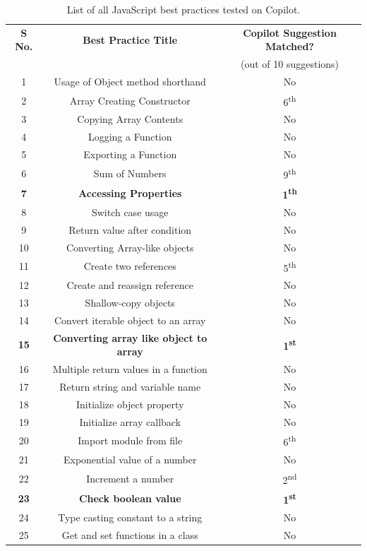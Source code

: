 \begin{table}[hbt!]
\begin{tabular}{|c|c|c|}
        \textbf{S No.} & \textbf{Best Practice  Title} & \textbf{Copilot Suggestion Matched?} \\
         & & (out of 10 suggestions) \\
         \hline
         1 & Usage of Object method shorthand & No \\
         \hline
         2 & Array Creating Constructor & 6\textsuperscript{th} \\
         \hline
         3 & Copying Array Contents  & No \\
         \hline
         4 & Logging a Function &  No \\
         \hline
         5 & Exporting a Function & No \\
         \hline
         6 & Sum of Numbers & 9\textsuperscript{th} \\
         \hline
         \textbf{7} & \textbf{Accessing Properties} & \textbf{1\textsuperscript{th}} \\
         \hline
         8 & Switch case usage & No \\
         \hline
         9 & Return value after condition & No \\
         \hline
         10 & Converting Array-like objects  & No \\
         \hline
         11 & Create two references & 5\textsuperscript{th} \\
         \hline
         12 & Create and reassign reference & No \\
         \hline
         13 & Shallow-copy objects  & No \\
         \hline
         14 & Convert iterable object to an array & No \\
         \hline
         \textbf{15} & \textbf{Converting array like object to array} & \textbf{1\textsuperscript{st}} \\
         \hline
          16 & Multiple return values in a function & No \\
          \hline
          17 & Return string and variable name & No \\
          \hline
          18 & Initialize object property & No \\
          \hline
          19 & Initialize array callback & No \\
          \hline
          20 & Import module from file & 6\textsuperscript{th} \\
          \hline
          21 & Exponential value of a number & No \\
          \hline
          22 & Increment a number & 2\textsuperscript{nd} \\
          \hline
          \textbf{23} & \textbf{Check boolean value} & \textbf{1\textsuperscript{st}} \\
          \hline
          24 & Type casting constant to a string & No \\
          \hline
          25 & Get and set functions in a class & No \\
          \hline
    \end{tabular}
    \caption{List of all JavaScript best practices tested on Copilot.}
    \label{tab:all_bp}
\end{table}
